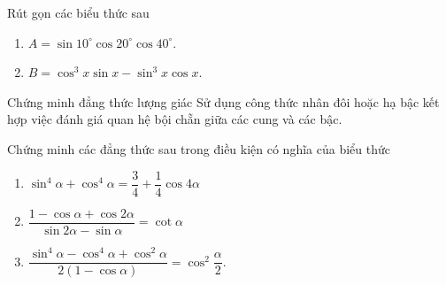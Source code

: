 \begin{vd}%
	Rút gọn các biểu thức sau
	\begin{multicols}{2}
		\begin{enumerate}
			\item $A=\sin10^\circ\cos20^\circ\cos40^\circ$.
			\item $B=\cos^3x\sin x-\sin^3x\cos x$.
		\end{enumerate}
	\end{multicols}
\end{vd}
\begin{dang}{Chứng minh đẳng thức lượng giác}
	Sử dụng công thức nhân đôi hoặc hạ bậc kết hợp việc đánh giá quan hệ bội chẵn giữa các cung và các bậc.
\end{dang}
\begin{vd}%
	Chứng minh các đẳng thức sau trong điều kiện có nghĩa của biểu thức
	\begin{enumerate}
		\item $\sin^4\alpha+\cos^4\alpha=\dfrac{3}{4}+\dfrac{1}{4}\cos4\alpha$
		\item $\dfrac{1-\cos\alpha+\cos2\alpha}{\sin2\alpha-\sin\alpha}=\cot\alpha$
		\item $\dfrac{\sin^4\alpha-\cos^4\alpha+\cos^2\alpha}{2(1-\cos\alpha)}=\cos^2\dfrac{\alpha}{2}$.
	\end{enumerate}
\end{vd}
